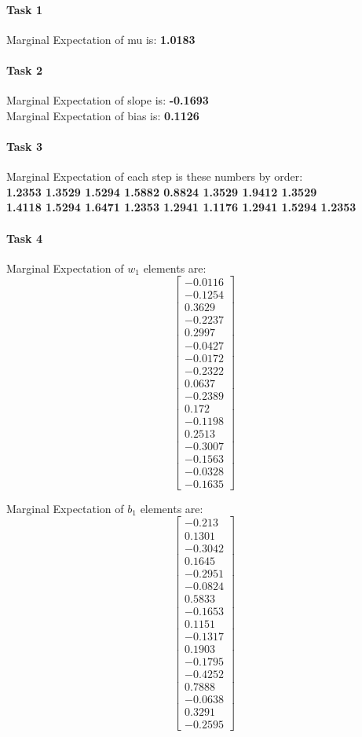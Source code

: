 \documentclass{article}
\begin{document}
\paragraph{Task 1}
Marginal Expectation of mu is: \textbf{1.0183}
\paragraph{Task 2}
Marginal Expectation of slope is: \textbf{-0.1693}\\
Marginal Expectation of bias is: \textbf{0.1126}
\paragraph{Task 3}
Marginal Expectation of each step is these numbers by order:\\ \textbf{1.2353
1.3529
1.5294
1.5882
0.8824
1.3529
1.9412
1.3529\\
1.4118
1.5294
1.6471
1.2353
1.2941
1.1176
1.2941
1.5294
1.2353}
\paragraph{Task 4}
Marginal Expectation of $w_1$ elements are:
\[
\begin{bmatrix}
-0.0116\\
-0.1254\\
0.3629\\
-0.2237\\
0.2997\\
-0.0427\\
-0.0172\\
-0.2322\\
0.0637\\
-0.2389\\
0.172\\
-0.1198\\
0.2513\\
-0.3007\\
-0.1563\\
-0.0328\\
-0.1635
\end{bmatrix}
\]

Marginal Expectation of $b_1$ elements are:
\[
\begin{bmatrix}
-0.213\\
0.1301\\
-0.3042\\
0.1645\\
-0.2951\\
-0.0824\\
0.5833\\
-0.1653\\
0.1151\\
-0.1317\\
0.1903\\
-0.1795\\
-0.4252\\
0.7888\\
-0.0638\\
0.3291\\
-0.2595
\end{bmatrix}
\]
\end{document}

